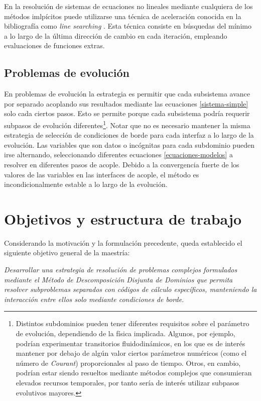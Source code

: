 En la resolución de sistemas de ecuaciones no lineales mediante cualquiera de los métodos imlpícitos
puede utilizarse una técnica de aceleración conocida en la bibliografía como \textit{line searching} \cite{kelley}. 
Esta técnica consiste en búsquedas del mínimo a lo largo de la última dirección de cambio en cada iteración, empleando evaluaciones de funciones extras.

\subsection*{Problemas de evolución}
\label{1:evolucion}
En problemas de evolución la estrategia es permitir que cada subsistema avance por separado acoplando sus resultados mediante las ecuaciones \ref{sistema-simple} solo cada ciertos pasos.
Esto se permite porque cada subsistema podría requerir subpasos de evolución diferentes\footnote{
Distintos subdominios pueden tener diferentes requisitos sobre el parámetro de evolución, dependiendo de la física implicada.
Algunos, por ejemplo, podrían experimentar transitorios fluidodinámicos, en los que es de interés mantener por debajo de algún valor 
ciertos parámetros numéricos (como el número de \textit{Courant}) proporcionales al paso de tiempo.
Otros, en cambio, podrían estar siendo resueltos mediante métodos complejos que consumieran elevados recursos temporales,
por tanto sería de interés utilizar subpasos evolutivos mayores.
}. Notar que no es necesario mantener la misma estrategia de selección de condiciones de borde para cada interfaz a lo largo de la evolución.
Las variables que son datos o incógnitas para cada subdominio pueden irse alternando,
seleccionando diferentes ecuaciones \ref{ecuaciones-modelos} a resolver en diferentes pasos de acople.
Debido a la convergencia fuerte de los valores de las variables en las interfaces de acople,
el método es incondicionalmente estable a lo largo de la evolución.

\section{Objetivos y estructura de trabajo}
\label{1:objetivos}
Considerando la motivación y la formulación precedente, queda establecido el siguiente objetivo general de la maestría:

\vspace{1em}
\begin{addmargin}[1.5em]{1.5em}
\textit{Desarrollar una estrategia de resolución de problemas complejos formulados mediante el
Método de Descomposición Disjunta de Dominios que permita resolver subproblemas separados con códigos de cálculo específicos,
manteniendo la interacción entre ellos solo mediante condiciones de borde.}
\end{addmargin}
\vspace{1em}

